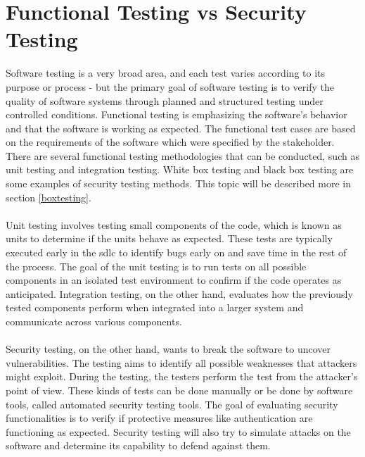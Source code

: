 \section{Functional Testing vs Security Testing}
\label{Functional Testing vs Security Testing}
Software testing is a very broad area, and each test varies according to its purpose or process - but the primary goal of software testing is to verify the quality of software systems through planned and structured testing under controlled conditions. Functional testing is emphasizing the software's behavior and that the software is working as expected. The functional test cases are based on the requirements of the software which were specified by the stakeholder. There are several functional testing methodologies that can be conducted, such as unit testing and integration testing. White box testing and black box testing are some examples of security testing methods. This topic will be described more in section \ref{boxtesting}. \cite{difftesting}
\\~\\
Unit testing involves testing small components of the code, which is known as units to determine if the units behave as expected. These tests are typically executed early in the \acrshort{sdlc} to identify bugs early on and save time in the rest of the process. The goal of the unit testing is to run tests on all possible components in an isolated test environment to confirm if the code operates as anticipated. Integration testing, on the other hand, evaluates how the previously tested components perform when integrated into a larger system and communicate across various components. 
\cite{unitvsintergration}
\\~\\
Security testing, on the other hand, wants to break the software to uncover vulnerabilities. The testing aims to identify all possible weaknesses that attackers might exploit. During the testing, the testers perform the test from the attacker's point of view. These kinds of tests can be done manually or be done by software tools, called automated security testing tools. The goal of evaluating security functionalities is to verify if protective measures like authentication are functioning as expected. Security testing will also try to simulate attacks on the software and determine its capability to defend against them.\cite{whysectest}





